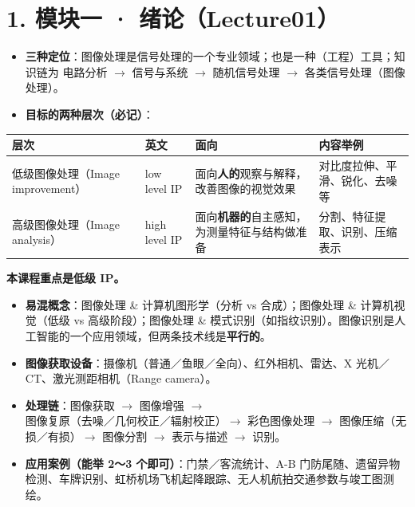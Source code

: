 \section*{1. 模块一 · 绪论（Lecture01）}
\begin{itemize}
\item \textbf{三种定位}：图像处理是信号处理的一个专业领域；也是一种（工程）工具；知识链为 电路分析 $\to$ 信号与系统 $\to$ 随机信号处理 $\to$ 各类信号处理（图像处理）。
\item \textbf{目标的两种层次（必记）}：
\end{itemize}
\begin{center}\small\renewcommand{\arraystretch}{1.25}
\begin{tabularx}{\linewidth}{|>{\centering\arraybackslash}p{.19\linewidth}|>{\centering\arraybackslash}p{.13\linewidth}|X|p{.23\linewidth}|}\hline
\textbf{层次}&\textbf{英文}&\centering\textbf{面向}&\centering\arraybackslash\textbf{内容举例}\\\hline
低级图像处理\newline（Image improvement）&low level IP&面向\textbf{人的}观察与解释，改善图像的视觉效果&对比度拉伸、平滑、锐化、去噪等\\\hline
高级图像处理\newline（Image analysis）&high level IP&面向\textbf{机器的}自主感知，为测量特征与结构做准备&分割、特征提取、识别、压缩表示\\\hline
\end{tabularx}\end{center}
\textbf{本课程重点是低级 IP。}
\begin{itemize}
\item \textbf{易混概念}：图像处理 \& 计算机图形学（分析 vs 合成）；图像处理 \& 计算机视觉（低级 vs 高级阶段）；图像处理 \& 模式识别（如指纹识别）。图像识别是人工智能的一个应用领域，但两条技术线是\textbf{平行的}。
\item \textbf{图像获取设备}：摄像机（普通／鱼眼／全向）、红外相机、雷达、X 光机／CT、激光测距相机（Range camera）。
\item \textbf{处理链}：图像获取 $\to$ 图像增强 $\to$ 图像复原（去噪／几何校正／辐射校正）$\to$ 彩色图像处理 $\to$ 图像压缩（无损／有损）$\to$ 图像分割 $\to$ 表示与描述 $\to$ 识别。
\item \textbf{应用案例（能举 2～3 个即可）}：门禁／客流统计、A-B 门防尾随、遗留异物检测、车牌识别、虹桥机场飞机起降跟踪、无人机航拍交通参数与竣工图测绘。
\end{itemize}
